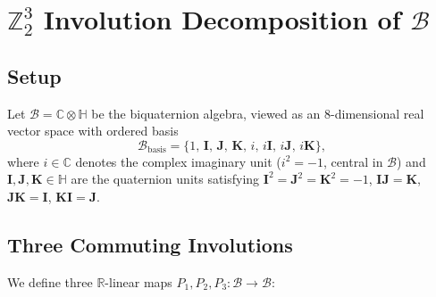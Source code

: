 %
%
%


\section{$\mathbb{Z}_2^3$ Involution Decomposition of $\mathcal{B}$}
\label{sec:algebra:involutions_z2z2z2}

\subsection{Setup}

Let $\mathcal{B} = \mathbb{C} \otimes \mathbb{H}$ be the biquaternion algebra,
viewed as an $8$-dimensional real vector space with ordered basis
\begin{equation}
  \mathcal{B}_\mathrm{basis} = \{1,\, \mathbf{I},\, \mathbf{J},\, \mathbf{K},\,
    i,\, i\mathbf{I},\, i\mathbf{J},\, i\mathbf{K}\},
  \label{eq:inv:basis}
\end{equation}
where $i \in \mathbb{C}$ denotes the complex imaginary unit
($i^2 = -1$, central in $\mathcal{B}$) and
$\mathbf{I}, \mathbf{J}, \mathbf{K} \in \mathbb{H}$ are the quaternion units
satisfying $\mathbf{I}^2 = \mathbf{J}^2 = \mathbf{K}^2 = -1$,
$\mathbf{I}\mathbf{J} = \mathbf{K}$, $\mathbf{J}\mathbf{K} = \mathbf{I}$,
$\mathbf{K}\mathbf{I} = \mathbf{J}$.

\subsection{Three Commuting Involutions}

We define three $\mathbb{R}$-linear maps $P_1, P_2, P_3 : \mathcal{B} \to \mathcal{B}$:

